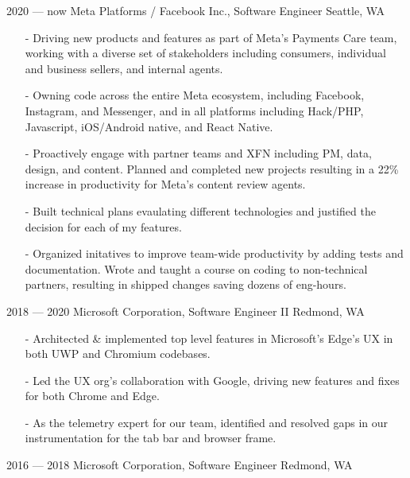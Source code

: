 \documentclass[print]{template/friggeri-cv}
\begin{document}
    \begin{entrylist}
        \entry
            {2020 --- now}
            {Meta Platforms / Facebook Inc., {\normalfont Software Engineer}}
            {Seattle, WA}
            {\begin{itemize}[leftmargin=*,itemsep=4pt]
                \item[-] Driving new products and features as part of Meta's Payments Care team, working with a diverse set of stakeholders including consumers, individual and business sellers, and internal agents.
                \item[-] Owning code across the entire Meta ecosystem, including Facebook, Instagram, and Messenger, and in all platforms including Hack/PHP, Javascript, iOS/Android native, and React Native.
                \item[-] Proactively engage with partner teams and XFN including PM, data, design, and content. Planned and completed new projects resulting in a 22\% increase in productivity for Meta's content review agents.
                \item[-] Built technical plans evaulating different technologies and justified the decision for each of my features.
                \item[-] Organized initatives to improve team-wide productivity by adding tests and documentation. Wrote and taught a course on coding to non-technical partners, resulting in shipped changes saving dozens of eng-hours.
             \end{itemize}}
        \entry
            {2018 --- 2020}
            {Microsoft Corporation, {\normalfont Software Engineer II}}
            {Redmond, WA}
            {\begin{itemize}[leftmargin=*,itemsep=4pt]
                \item[-] Architected \& implemented top level features in Microsoft's Edge's UX in both UWP and Chromium codebases.
                \item[-] Led the UX org's collaboration with Google, driving new features and fixes for both Chrome and Edge.
                \item[-] As the telemetry expert for our team, identified and resolved gaps in our instrumentation for the tab bar and browser frame.
             \end{itemize}}
        \entry
            {2016 --- 2018}
            {Microsoft Corporation, {\normalfont Software Engineer}}
            {Redmond, WA}
            {\begin{itemize}[leftmargin=*,itemsep=4pt]

\end{itemize}}
\end{entrylist}
\end{document}
